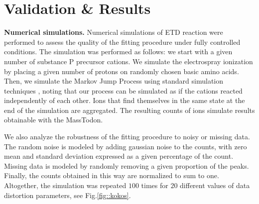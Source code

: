 \documentclass{llncs}
\begin{document}
\section{Validation \& Results}

\textbf{Numerical simulations.} Numerical simulations of ETD reaction were performed to assess the quality of the fitting procedure under fully controlled conditions. The simulation was performed as follows: we start with a given number of substance P precursor cations. We simulate the electrospray ionization by placing a given number of protons on randomly chosen basic amino acids. Then, we simulate the Markov Jump Process using standard simulation techniques \cite{Gillespie1977-fr}, noting that our process can be simulated as if the cations reacted independently of each other. Ions that find themselves in the same state at the end of the simulation are aggregated. The resulting counts of ions simulate results obtainable with the {\sc MassTodon}.

We also analyze the robustness of the fitting procedure to noisy or missing data. The random noise is modeled by adding gaussian noise to the counts, with zero mean and standard deviation expressed as a given percentage of the count. Missing data is modeled by randomly removing a given proportion of the peaks. Finally, the counts obtained in this way are normalized to sum to one. Altogether, the simulation was repeated $100$ times for $20$ different values of data distortion parameters, see Fig.\ref{fig::kokos}.
\end{document}
